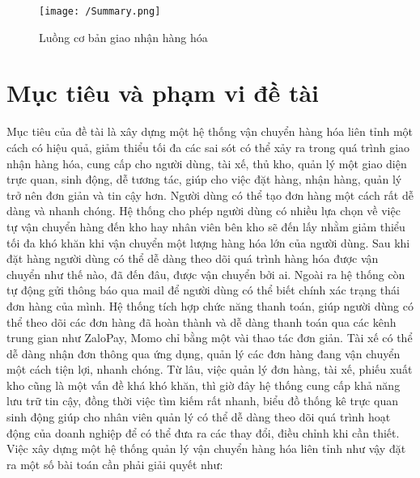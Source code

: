 	\begin{figure}[H]
		\texttt{[image: /Summary.png]}
		\centering
		\linebreak
		\caption{Luồng cơ bản giao nhận hàng hóa}
	\end{figure}
	
	
	\section{Mục tiêu và phạm vi đề tài}
	    Mục tiêu của đề tài là xây dựng một hệ thống vận chuyển hàng hóa liên tỉnh một cách có hiệu quả, giảm thiểu tối đa các sai sót có thể xảy ra trong quá trình giao nhận hàng hóa, cung cấp cho người dùng, tài xế, thủ kho, quản lý một giao diện trực quan, sinh động, dễ tương tác, giúp cho việc đặt hàng, nhận hàng, quản lý trở nên đơn giản và tin cậy hơn. Người dùng có thể tạo đơn hàng một cách rất dễ dàng và nhanh chóng. Hệ thống cho phép người dùng có nhiều lựa chọn về việc tự vận chuyển hàng đến kho hay nhân viên bên kho sẽ đến lấy nhằm giảm thiểu tối đa khó khăn khi vận chuyển một lượng hàng hóa lớn của người dùng. Sau khi đặt hàng người dùng có thể dễ dàng theo dõi quá trình hàng hóa được vận chuyển như thế nào, đã đến đâu, được vận chuyển bởi ai. Ngoài ra hệ thống còn tự động gửi thông báo qua mail để người dùng có thể biết chính xác trạng thái đơn hàng của mình. Hệ thống tích hợp chức năng thanh toán, giúp người dùng có thể theo dõi các đơn hàng đã hoàn thành và dễ dàng thanh toán qua các kênh trung gian như ZaloPay, Momo chỉ bằng một vài thao tác đơn giản. Tài xế có thể dễ dàng nhận đơn thông qua ứng dụng, quản lý các đơn hàng đang vận chuyển một cách tiện lợi, nhanh chóng. Từ lâu, việc quản lý đơn hàng, tài xế, phiếu xuất kho cũng là một vấn đề khá khó khăn, thì giờ đây hệ thống cung cấp khả năng lưu trữ tin cậy, đồng thời việc tìm kiếm rất nhanh, biểu đồ thống kê trực quan sinh động giúp cho nhân viên quản lý có thể dễ dàng theo dõi quá trình hoạt động của doanh nghiệp để có thể đưa ra các thay đổi, điều chỉnh khi cần thiết.
	    Việc xây dựng một hệ thống quản lý vận chuyển hàng hóa liên tỉnh như vậy đặt ra một số bài toán cần phải giải quyết như:
